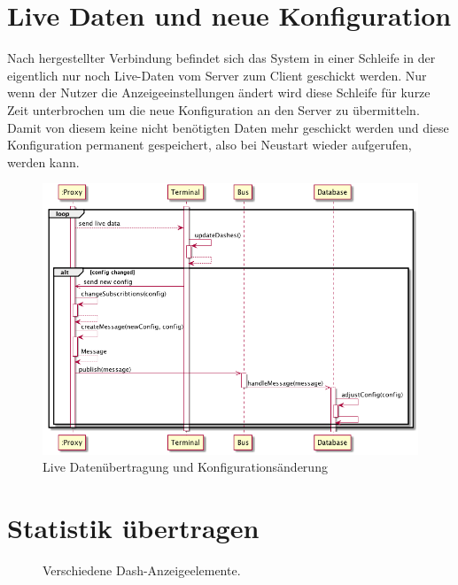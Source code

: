 \documentclass[entwurf.tex]{subfiles}
\begin{document}
  	\section{Live Daten und neue Konfiguration}
  	\label{Sequence:LiveDataNewConfig}
  		Nach hergestellter Verbindung befindet sich das System in einer Schleife in der eigentlich nur noch Live-Daten vom Server zum Client geschickt werden. Nur wenn der Nutzer die Anzeigeeinstellungen ändert wird diese Schleife für kurze Zeit unterbrochen um die neue Konfiguration an den Server zu übermitteln. Damit von diesem keine nicht benötigten Daten mehr geschickt werden und diese Konfiguration permanent gespeichert, also bei Neustart wieder aufgerufen, werden kann.
  		\begin{figure}[H]
  			\begin{center}
 				\includegraphics[width=\textwidth]{diagrams/ChangeDashConfig.png}
  				\caption{Live Datenübertragung und Konfigurationsänderung}
  			\end{center}
  		\end{figure}
  		
  	\section{Statistik übertragen}
  		
  		\begin{figure}[H]
  			\caption{Verschiedene Dash-Anzeigeelemente.}
  		\end{figure}
  		
  	
\end{document}
